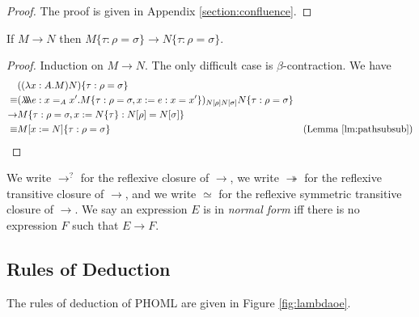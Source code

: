 \documentclass[a4paper,UKenglish]{lipics-v2016}
\newcommand*{\triplelambda}{\ensuremath{\lambda \!\! \lambda \!\! \lambda}}
\theoremstyle{plain}
\theoremstyle{definition}
\begin{document}
\begin{proof}
The proof is given in Appendix \ref{section:confluence}.
\end{proof}

\begin{lemma}
\label{lm:resp-sub}
If $M \rightarrow N$ then $M \{ \tau : \rho = \sigma \} \rightarrow N \{ \tau : \rho = \sigma \}$.
\end{lemma}

\begin{proof}
Induction on $M \rightarrow N$.  The only difficult case is $\beta$-contraction.  We have
\begin{align*}
& ((\lambda x:A.M)N)\{ \tau : \rho = \sigma \} \\
\equiv & (\triplelambda e : x =_A x' . M \{ \tau : \rho = \sigma , x := e : x = x' \})_{N [ \rho ] N [ \sigma ]} N \{ \tau : \rho = \sigma \} \\
\rightarrow & M \{ \tau : \rho = \sigma, x := N \{ \tau \} : N [ \rho ] = N [ \sigma ] \} \\
\equiv & M [ x := N ] \{ \tau : \rho = \sigma \} & (\text{Lemma \ref{lm:pathsubsub}})
\end{align*}
\end{proof}

We write $\rightarrow^?$ for the reflexive closure of $\rightarrow$, 
we write $\twoheadrightarrow$ for the reflexive transitive closure of $\rightarrow$, and we write $\simeq$ for the reflexive symmetric transitive closure of $\rightarrow$.
We say an expression $E$ is in \emph{normal form} iff there is no expression $F$ such that $E \rightarrow F$.

\subsection{Rules of Deduction}

The rules of deduction of PHOML are given in Figure \ref{fig:lambdaoe}.
\end{document}
